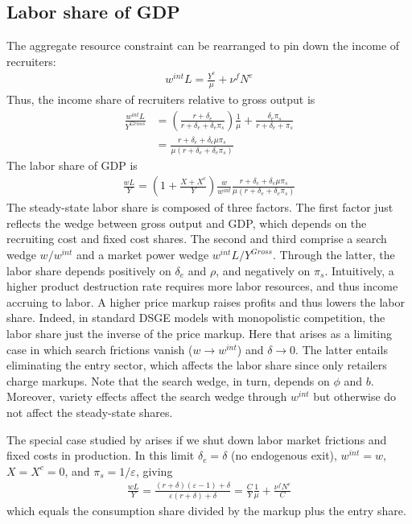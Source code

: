 \documentclass[authoryear, review, 12pt]{elsarticle}
\newcommand{\pfrac}[2]{\left(\dfrac{#1}{#2}\right)}
\renewcommand{\pfrac}[2]{\left(\frac{#1}{#2}\right)}
\begin{document}
	\subsection{Labor share of GDP}
	The aggregate resource constraint can be rearranged to pin down the income of recruiters:
	\begin{align}
		w^{int}L=\frac{Y^c}{\mu}+\nu^f N^e
	\end{align}
	Thus, the income share of recruiters relative to gross output is
	\begin{align}
		\frac{w^{int}L}{Y^{Gross}}&=\pfrac{r+\delta_e}{r+\delta_e+\delta_e \pi_s}\frac{1}{\mu}+\frac{\delta_e\pi_s}{r+\delta_e+\pi_s}\\
		&=\frac{r+\delta_e+\delta_e \mu \pi_s}{\mu(r+\delta_e+\delta_e\pi_s)}
	\end{align}
	The labor share of GDP is
	\begin{align}
		\frac{wL}{Y} = (1+\frac{X+X^c}{Y})\frac{w}{w^{int}}\frac{r+\delta_e+\delta_e \mu \pi_s}{\mu(r+\delta_e+\delta_e\pi_s)}
	\end{align}
	The steady-state labor share is composed of three factors. The first factor just reflects the wedge between gross output and GDP, which depends on the recruiting cost and fixed cost shares. The second and third comprise a search wedge $w/w^{int}$ and a market power wedge $w^{int}L/Y^{Gross}$. Through the latter, the labor share depends positively on $\delta_e$ and $\rho$, and negatively on $\pi_s$. Intuitively, a higher product destruction rate requires more labor resources, and thus income accruing to labor. A higher price markup raises profits and thus lowers the labor share. Indeed, in standard DSGE models with monopolistic competition, the labor share just the inverse of the price markup. Here that arises as a limiting case in which search frictions vanish ($w\to w^{int}$) and $\delta \to 0$. The latter entails eliminating the entry sector, which affects the labor share since only retailers charge markups. Note that the search wedge, in turn, depends on $\phi$ and $b$. Moreover, variety effects affect the search wedge through $w^{int}$ but otherwise do not affect the steady-state shares.
	
	The special case studied by \citet{bilbiie_2012} arises if we shut down labor market frictions and fixed costs in production. In this limit $\delta_e=\delta$ (no endogenous exit), $w^{int}=w$, $X=X^c=0$, and $\pi_s=1/\varepsilon$, giving
	\begin{align}
		\frac{wL}{Y}=\frac{(r+\delta)(\varepsilon-1)+\delta}{\varepsilon(r+\delta)+\delta}=\frac{C}{Y}\frac{1}{\mu}+\frac{\nu^f N^e}{C}
	\end{align}
	which equals the consumption share divided by the markup plus the entry share.
	
\end{document}
